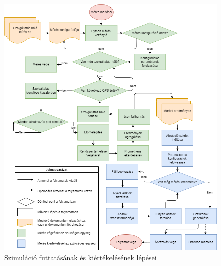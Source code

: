 \begin{figure}[!ht]
\centering
\includegraphics[width=150mm, keepaspectratio]{figures/measurement_and_draw_workflow.png}
\caption{Szimuláció futtatásának és kiértékelésének lépései}
\label{fig:measurement_and_draw_workflow}
\end{figure}

